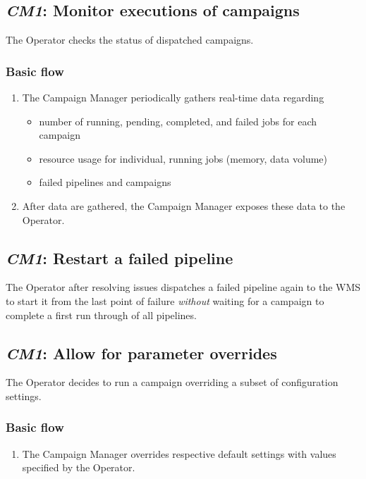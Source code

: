 \documentclass[DM,lsstdraft,toc]{lsstdoc}
\newcommand{\usecase}[2]{\subsection{\emph{#1}: #2}\label{use:#1}}
\newenvironment{flow}[1][Basic flow]
  {\subsubsection*{#1}\begin{enumerate}[label=\alph*.,itemsep=0pt]}
  {\end{enumerate}}
\begin{document}
\usecase{CM1}{Monitor executions of campaigns}
The Operator checks the status of dispatched campaigns.
\begin{flow}
  \item
    The Campaign Manager periodically gathers real-time data regarding
    \begin{itemize}
      \item
        number of running, pending, completed, and failed jobs for each campaign
      \item
        resource usage for individual, running jobs (memory, data volume)
      \item
        failed pipelines and campaigns
    \end{itemize}
  \item
    After data are gathered, the Campaign Manager exposes these data to the
    Operator.
\end{flow}

\usecase{CM1}{Restart a failed pipeline}
The Operator after resolving issues dispatches a failed pipeline again to the
WMS to start it from the last point of failure \emph{without} waiting for a
campaign to complete a first run through of all pipelines.

\usecase{CM1}{Allow for parameter overrides}
The Operator decides to run a campaign overriding a subset of configuration settings.
\begin{flow}
  \item
    The Campaign Manager overrides respective default settings with values
    specified by the Operator.
\end{flow}

%
\end{document}
